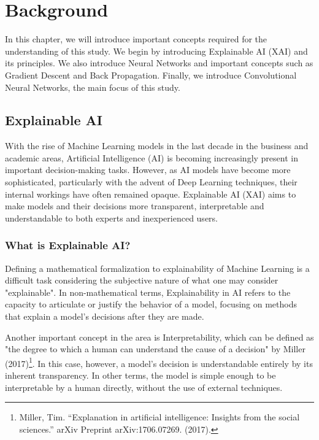 

\enlargethispage{-1\baselineskip}

\chapter{Background}

In this chapter, we will introduce important concepts required for the understanding of this study.
We begin by introducing Explainable AI (XAI) and its principles. We also introduce Neural Networks and important concepts such as Gradient Descent and Back Propagation. 
Finally, we introduce Convolutional Neural Networks, the main focus of this study.

\section{Explainable AI}

With the rise of Machine Learning models in the last decade in the business and academic areas, Artificial Intelligence (AI) is becoming increasingly present in important decision-making tasks. 
However, as AI models have become more sophisticated, particularly with the advent of Deep Learning techniques, their internal workings have often remained opaque. 
Explainable AI (XAI) aims to make models and their decisions more transparent, interpretable and understandable to both experts and inexperienced users.

\subsection{What is Explainable AI?}

Defining a mathematical formalization to explainability of Machine Learning is a difficult task considering the subjective nature of what one may consider "explainable". In non-mathematical terms, 
Explainability in AI refers to the capacity to articulate or justify the behavior of a model, focusing on methods that explain a model's decisions after they are made.

Another important concept in the area is Interpretability, which can be defined as "the degree to which a human can understand the cause of a decision" by Miller (2017)\footnote[1]{Miller, Tim. “Explanation in artificial intelligence: Insights from the social sciences.” arXiv Preprint arXiv:1706.07269. (2017).}.
In this case, however, a model's decision is understandable entirely by its inherent transparency. In other terms, the model is simple enough to be interpretable by a human directly, without the use of external techniques.


